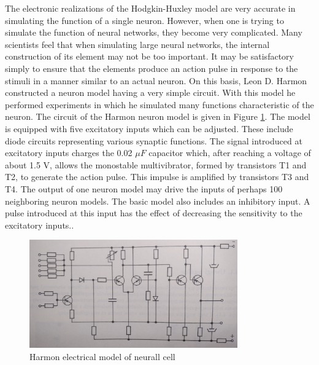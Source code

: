 The electronic realizations of the Hodgkin-Huxley model are very accurate in simulating the
function of a single neuron. However, when one is trying to simulate the function of neural 
networks, they become very complicated. 
Many scientists feel that when simulating large neural networks, the internal construction of 
its element may not be too important. It may be satisfactory simply to ensure that the elements 
produce an action pulse in response to the stimuli in a manner similar to an actual neuron. 
On this basis, Leon D. Harmon constructed a neuron model having a very simple circuit.
With this model he performed experiments in which he simulated many functions characteristic of
the neuron.
The circuit of the Harmon neuron model is given in Figure \ref{fig:harmon}.
The model is equipped with five excitatory inputs which can be adjusted. 
These include diode circuits representing various synaptic functions. 
The signal introduced at excitatory inputs charges the 0.02 $\mu F$ capacitor which, after reaching
a voltage of about 1.5 V, allows the monostable multivibrator, formed by transistors T1 and T2, 
to generate the action pulse. This impulse is amplified by transistors T3 and T4. 
The output of one neuron model may drive the inputs of perhaps 100 neighboring neuron models.
The basic model also includes an inhibitory input. A pulse introduced at this input has the effect
of decreasing the sensitivity to the excitatory inputs.. 
\begin{figure}[htb] 
	\label{fig:harmon}
	\centering
	\includegraphics[width=0.8\textwidth]{figures/harmon}
	\caption{Harmon electrical model of neurall cell}
\end{figure}
